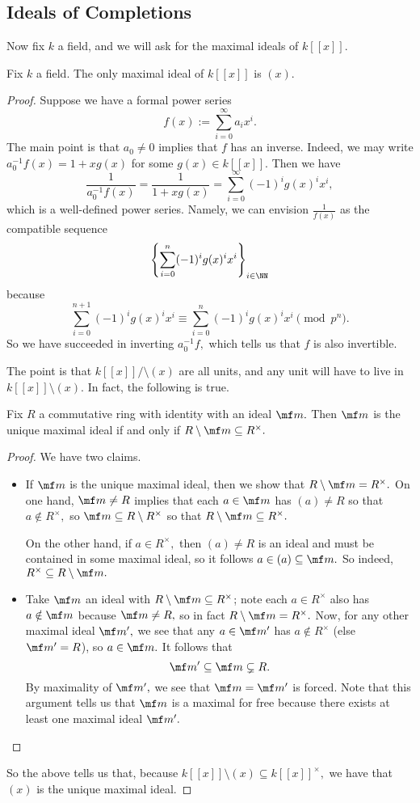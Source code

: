 \documentclass[../notes.tex]{subfiles}
\begin{document}
\subsection{Ideals of Completions}
Now fix $k$ a field, and we will ask for the maximal ideals of $k[[x]].$
\begin{proposition}
	Fix $k$ a field. The only maximal ideal of $k[[x]]$ is $(x).$
\end{proposition}
\begin{proof}
	Suppose we have a formal power series
	\[f(x):=\sum_{i=0}^\infty a_ix^i.\]
	The main point is that $a_0\ne0$ implies that $f$ has an inverse. Indeed, we may write $a_0^{-1}f(x)=1+xg(x)$ for some $g(x)\in k[[x]].$ Then we have
	\[\frac1{a_0^{-1}f(x)}=\frac1{1+xg(x)}=\sum_{i=0}^\infty(-1)^ig(x)^ix^i,\]
	which is a well-defined power series. Namely, we can envision $\frac1{f(x)}$ as the compatible sequence
	\[\left\{\sum_{i=0}^n(-1)^ig(x)^ix^i\right\}_{i\in\NN}\]
	because
	\[\sum_{i=0}^{n+1}(-1)^ig(x)^ix^i\equiv\sum_{i=0}^n(-1)^ig(x)^ix^i\pmod{p^n}.\]
	So we have succeeded in inverting $a_0^{-1}f,$ which tells us that $f$ is also invertible.
	
	The point is that $k[[x]]/\setminus(x)$ are all units, and any unit will have to live in $k[[x]]\setminus(x).$ In fact, the following is true.
	\begin{lemma} \label{lem:uniqmax}
		Fix $R$ a commutative ring with identity with an ideal $\mf m.$ Then $\mf m$ is the unique maximal ideal if and only if $R\setminus\mf m\subseteq R^\times.$
	\end{lemma}
	\begin{proof}
		We have two claims.
		\begin{itemize}
			\item If $\mf m$ is the unique maximal ideal, then we show that $R\setminus\mf m=R^\times.$ On one hand, $\mf m\ne R$ implies that each $a\in\mf m$ has $(a)\ne R$ so that $a\notin R^\times,$ so $\mf m\subseteq R\setminus R^\times$ so that $R\setminus\mf m\subseteq R^\times.$
			
			On the other hand, if $a\in R^\times,$ then $(a)\ne R$ is an ideal and must be contained in some maximal ideal, so it follows $a\in(a)\subseteq\mf m.$ So indeed, $R^\times\subseteq R\setminus\mf m.$
			\item Take $\mf m$ an ideal with $R\setminus\mf m\subseteq R^\times$; note each $a\in R^\times$ also has $a\notin\mf m$ because $\mf m\ne R,$ so in fact $R\setminus\mf m=R^\times.$ Now, for any other maximal ideal $\mf m',$ we see that any $a\in\mf m'$ has $a\notin R^\times$ (else $\mf m'=R$), so $a\in\mf m.$ It follows that
			\[\mf m'\subseteq\mf m\subsetneq R.\]
			By maximality of $\mf m',$ we see that $\mf m=\mf m'$ is forced. Note that this argument tells us that $\mf m$ is a maximal for free because there exists at least one maximal ideal $\mf m'.$
			\qedhere
		\end{itemize}
	\end{proof}
	So the above tells us that, because $k[[x]]\setminus(x)\subseteq k[[x]]^\times,$ we have that $(x)$ is the unique maximal ideal.
\end{proof}
\end{document}
